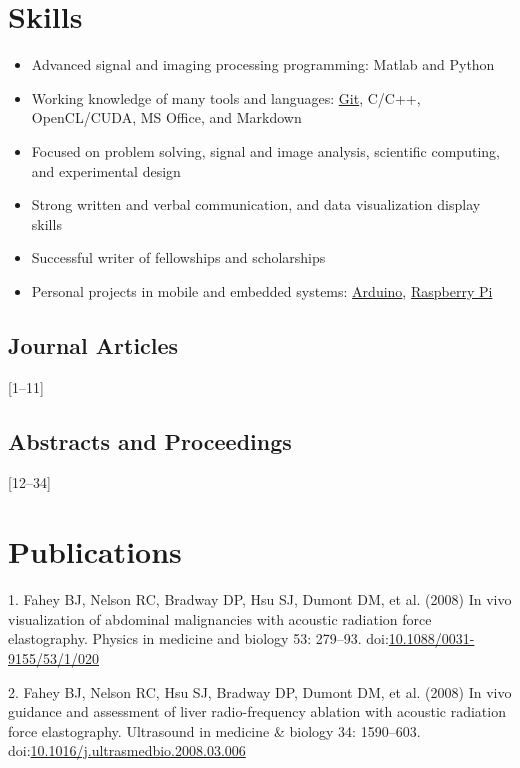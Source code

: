 \documentclass[letterpaper,10pt,english]{sphinxmanual}
\begin{document}
\section{Skills}
\label{resume:skills}\begin{itemize}
\item {} 
Advanced signal and imaging processing programming: Matlab and Python

\item {} 
Working knowledge of many tools and languages:
\href{http://git-scm.com/}{Git}, C/C++, OpenCL/CUDA, MS Office, and
Markdown

\item {} 
Focused on problem solving, signal and image analysis, scientific
computing, and experimental design

\item {} 
Strong written and verbal communication, and data visualization
display skills

\item {} 
Successful writer of fellowships and scholarships

\item {} 
Personal projects in mobile and embedded systems:
\href{http://www.arduino.cc/}{Arduino}, \href{http://www.raspberrypi.org/}{Raspberry
Pi}

\end{itemize}


\subsection{Journal Articles}
\label{resume:journal-articles}
{[}1–11{]}


\subsection{Abstracts and Proceedings}
\label{resume:abstracts-and-proceedings}
{[}12–34{]}


\section{Publications}
\label{resume:publications}
1. Fahey BJ, Nelson RC, Bradway DP, Hsu SJ, Dumont DM, et al. (2008) In
vivo visualization of abdominal malignancies with acoustic radiation
force elastography. Physics in medicine and biology 53: 279–93.
doi:\href{http://dx.doi.org/10.1088/0031-9155/53/1/020}{10.1088/0031-9155/53/1/020}

2. Fahey BJ, Nelson RC, Hsu SJ, Bradway DP, Dumont DM, et al. (2008) In
vivo guidance and assessment of liver radio-frequency ablation with
acoustic radiation force elastography. Ultrasound in medicine \& biology
34: 1590–603.
doi:\href{http://dx.doi.org/10.1016/j.ultrasmedbio.2008.03.006}{10.1016/j.ultrasmedbio.2008.03.006}
\end{document}

